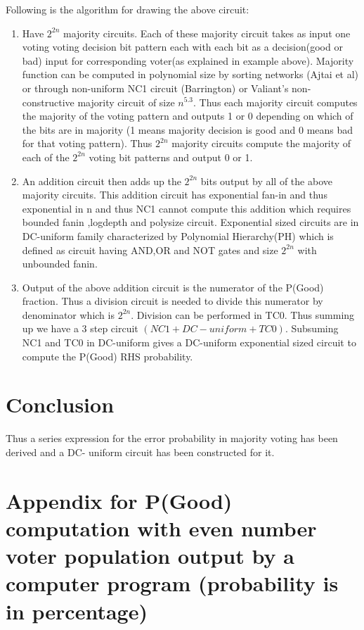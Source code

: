 \documentclass[11pt,onecolumn]{article}
\begin{document}
Following is the algorithm for drawing the above circuit:
\begin{enumerate}
\item Have $2^{2n}$ majority circuits. Each of these majority circuit takes as input one voting
voting decision bit pattern each with each bit as a decision(good or bad) input for
corresponding voter(as explained in example above). Majority function can be computed
in polynomial size by sorting networks (Ajtai et al) or through non-uniform NC1 circuit
(Barrington) or Valiant's non-constructive majority circuit of size $n^5.3$. Thus each
majority circuit computes the majority of the voting pattern and outputs 1 or 0 depending
on which of the bits are in majority (1 means majority decision is good and 0 means bad
for that voting pattern). Thus $2^{2n}$ majority circuits compute the majority of each of the
$2^{2n}$ voting bit patterns and output 0 or 1.
\item An addition circuit then adds up the $2^{2n}$ bits output by all of the above majority circuits.
This addition circuit has exponential fan-in and thus exponential in n and thus NC1
cannot compute this addition which requires bounded fanin ,logdepth and polysize circuit.
Exponential sized circuits are in DC-uniform family characterized by Polynomial
Hierarchy(PH) which is defined as circuit
having AND,OR and NOT gates and size $2^{2n}$ with unbounded fanin.
\item Output of the above addition circuit is the numerator of the P(Good) fraction. Thus a
division circuit is needed to divide this numerator by denominator which is $2^{2n}$. Division
can be performed in TC0. Thus summing up we have a 3 step circuit $(NC1 + DC-uniform
+ TC0)$. Subsuming NC1 and TC0 in DC-uniform gives a DC-uniform exponential sized
circuit to compute the P(Good) RHS probability.
\end{enumerate}

\section{Conclusion}
Thus a series expression for the error probability in majority voting has been derived and a DC-
uniform circuit has been constructed for it.

\section{Appendix for P(Good) computation with even number voter population output by a computer program (probability is in percentage)}
\end{document}
